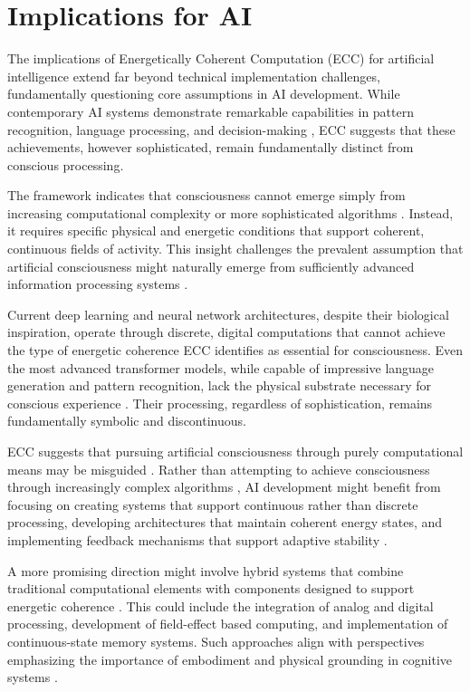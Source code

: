 \section{Implications for AI}

The implications of Energetically Coherent Computation (ECC) for artificial intelligence extend far beyond technical implementation challenges, fundamentally questioning core assumptions in AI development. While contemporary AI systems demonstrate remarkable capabilities in pattern recognition, language processing, and decision-making \cite{Marcus2019}, ECC suggests that these achievements, however sophisticated, remain fundamentally distinct from conscious processing.

The framework indicates that consciousness cannot emerge simply from increasing computational complexity or more sophisticated algorithms \cite{Dreyfus1992}. Instead, it requires specific physical and energetic conditions that support coherent, continuous fields of activity. This insight challenges the prevalent assumption that artificial consciousness might naturally emerge from sufficiently advanced information processing systems \cite{Bostrom2014}.

Current deep learning and neural network architectures, despite their biological inspiration, operate through discrete, digital computations that cannot achieve the type of energetic coherence ECC identifies as essential for consciousness. Even the most advanced transformer models, while capable of impressive language generation and pattern recognition, lack the physical substrate necessary for conscious experience \cite{Lake2017}. Their processing, regardless of sophistication, remains fundamentally symbolic and discontinuous.

ECC suggests that pursuing artificial consciousness through purely computational means may be misguided \cite{Churchland2013}. Rather than attempting to achieve consciousness through increasingly complex algorithms \cite{butlin2023consciousnessartificialintelligenceinsights}, AI development might benefit from focusing on creating systems that support continuous rather than discrete processing, developing architectures that maintain coherent energy states, and implementing feedback mechanisms that support adaptive stability \cite{Brooks1999}.

A more promising direction might involve hybrid systems that combine traditional computational elements with components designed to support energetic coherence \cite{Hawkins2021}. This could include the integration of analog and digital processing, development of field-effect based computing, and implementation of continuous-state memory systems. Such approaches align with perspectives emphasizing the importance of embodiment and physical grounding in cognitive systems \cite{Braitenberg1986}.

